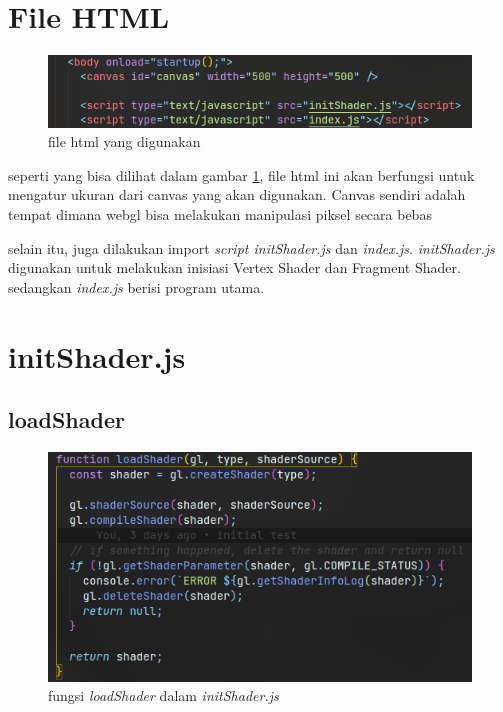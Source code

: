 \section{File HTML}

\begin{figure}[h]
    \includegraphics[width= \textwidth]{grafika/html.png}
    \caption{file html yang digunakan}
    \label{fig:html}
\end{figure}

seperti yang bisa dilihat dalam gambar \ref{fig:html}, file html ini akan berfungsi untuk mengatur ukuran dari canvas yang akan digunakan.
Canvas sendiri adalah tempat dimana webgl bisa melakukan manipulasi piksel secara bebas

selain itu, juga dilakukan import \emph{script initShader.js} dan \emph{index.js}.
\emph{initShader.js} digunakan untuk melakukan inisiasi Vertex Shader dan Fragment Shader.
sedangkan \emph{index.js} berisi program utama.



\section{initShader.js}

\subsection{loadShader}

\begin{figure}[h]
    \includegraphics[width = \textwidth]{grafika/loadShader.png}
    \caption{fungsi \emph{loadShader} dalam \emph{initShader.js}}
    \label{fig: loadShader}
\end{figure}

